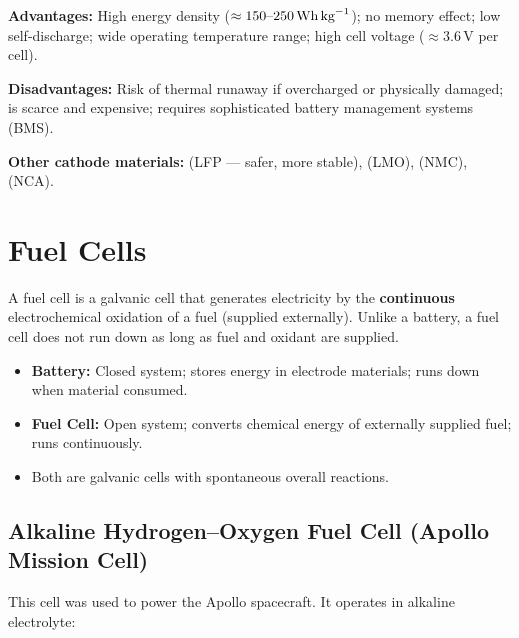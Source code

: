 \textbf{Advantages:} High energy density ($\approx 150\text{--}250\,\text{Wh\,kg}^{-1}$); no memory effect; low self-discharge; wide operating temperature range; high cell voltage ($\approx 3.6\,\text{V}$ per cell).

\textbf{Disadvantages:} Risk of thermal runaway if overcharged or physically damaged;  is scarce and expensive; requires sophisticated battery management systems (BMS).

\textbf{Other cathode materials:}  (LFP --- safer, more stable),  (LMO),  (NMC),  (NCA).

\section{Fuel Cells}

A fuel cell is a galvanic cell that generates electricity by the \textbf{continuous} electrochemical oxidation of a fuel (supplied externally). Unlike a battery, a fuel cell does not run down as long as fuel and oxidant are supplied.

\begin{conceptbox}
\begin{itemize}
    \item \textbf{Battery:} Closed system; stores energy in electrode materials; runs down when material consumed.
    \item \textbf{Fuel Cell:} Open system; converts chemical energy of externally supplied fuel; runs continuously.
    \item Both are galvanic cells with spontaneous overall reactions.
\end{itemize}
\end{conceptbox}

\subsection{Alkaline Hydrogen--Oxygen Fuel Cell (Apollo Mission Cell)}

This cell was used to power the Apollo spacecraft. It operates in alkaline  electrolyte:

